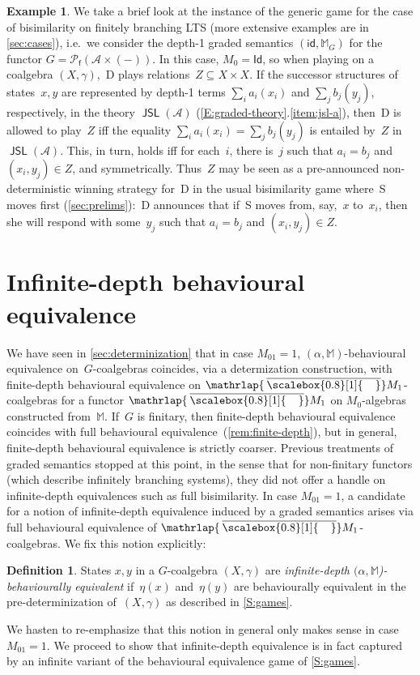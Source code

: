 \documentclass[sigconf,
			final%
			nonacm
                        ]{acmart}
\numberwithin{equation}{section}
\numberwithin{equation}{section}
\theoremstyle{plain}
\theoremstyle{definition}
\newtheorem{defn}[thm]{Definition}
\newtheorem{expl}[thm]{Example}
\newcommand{\mybar}[3]{%
  \mathrlap{\hspace{#2}\overline{\scalebox{#1}[1]{\hphantom{\ensuremath{#3}}\vphantom{\rule{0pt}{5.5pt}}}}}\ensuremath{#3}
}
\newcommand{\barM}{\mybar{0.8}{2pt}{M}_1}
\newcommand{\id}{\mathsf{id}}
\newcommand{\M}{\mathbb{M}}                   %
\newcommand{\A}{\mathcal{A}}            %
\DeclareMathOperator{\JSL}{\mathsf{JSL}}
\newcommand{\Id}{\mathsf{Id}}                 %
\newcommand{\pow}{\mathscr P}              %
\newcommand{\powf}{\pow_{\mathsf f}}
\begin{document}
\begin{expl}\label{expl:bisim-instance}
  We take a brief look at the instance of the generic game for the
  case of bisimilarity on finitely branching LTS (more extensive
  examples are in \cref{sec:cases}), i.e.~we consider the depth-1
  graded semantics $(\id, \M_G)$ for the functor
  $G=\powf(\A\times(-))$. In this case, $M_0=\Id$, so when playing on
  a coalgebra $(X,\gamma)$,~D plays relations~$Z\subseteq X\times
  X$. If the successor structures of states~$x,y$ are represented by
  depth-1 terms $\sum_{i}a_i(x_i)$ and $\sum_j b_j(y_j)$,
  respectively, in the theory $\JSL(\A)$
  (\cref{E:graded-theory}.\ref{item:jsl-a}), then~D is allowed to
  play~$Z$ iff the equality $\sum_{i}a_i(x_i)=\sum_j b_j(y_j)$ is
  entailed by~$Z$ in $\JSL(\A)$. This, in turn, holds iff for
  each~$i$, there is~$j$ such that $a_i=b_j$ and $(x_i,y_j)\in Z$, and
  symmetrically. Thus~$Z$ may be seen as a pre-announced
  non-deterministic winning strategy for~D in the usual bisimilarity
  game where~S moves first (\cref{sec:prelims}):~D announces that
  if~S moves from, say,~$x$ to~$x_i$, then she will respond with
  some~$y_j$ such that $a_i=b_j$ and $(x_i,y_j)\in Z$.
\end{expl}


\section{Infinite-depth behavioural
  equivalence}\label{sec:infinte-depth}

\sloppypar
\noindent We have seen in \cref{sec:determinization} that in case
\mbox{$M_01=1$}, $(\alpha, \M)$-behavioural equivalence
on~$G$-coalgebras coincides, via a determization construction, with
finite-depth behavioural equivalence on $\barM$-coalgebras for a
functor $\barM$ on $M_0$-algebras constructed from~$\M$. If~$G$ is
finitary, then finite-depth behavioural equivalence coincides with
full behavioural equivalence~(\cref{rem:finite-depth}), but in
general, finite-depth behavioural equivalence is strictly
coarser. Previous treatments of graded semantics stopped at this
point, in the sense that for non-finitary functors (which describe
infinitely branching systems), they did not offer a handle on
infinite-depth equivalences such as full bisimilarity.
In case $M_01=1$, a candidate for a notion
of infinite-depth equivalence induced by a graded semantics arises via
full behavioural equivalence of $\barM$-coalgebras. We fix this notion
explicitly:
\begin{defn}
  States $x,y$ in a $G$-coalgebra $(X,\gamma)$ are
  \emph{in\-fin\-ite-depth $(\alpha,\M$)-behaviourally equivalent}
  if~$\eta(x)$ and~$\eta(y)$ are behaviourally equivalent in the
  pre-det\-er\-min\-i\-za\-tion of~$(X,\gamma)$ as described in
  \cref{S:games}.
\end{defn}
\noindent We hasten to re-emphasize that this notion in general only
makes sense in case $M_01=1$. We proceed to show that infinite-depth
equivalence is in fact captured by an infinite variant of the
behavioural equivalence game of \cref{S:games}.
\end{document}
